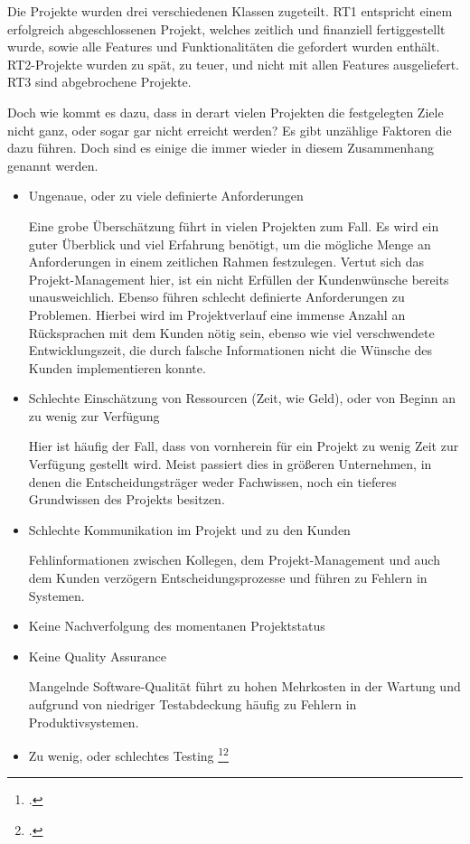 \documentclass[12pt,a4paper,bibliography=totocnumbered,listof=totocnumbered]{scrartcl}
\begin{document}
Die Projekte wurden drei verschiedenen Klassen zugeteilt. RT1 entspricht einem erfolgreich abgeschlossenen Projekt, welches zeitlich und finanziell fertiggestellt wurde, sowie alle Features und Funktionalitäten die gefordert wurden enthält. RT2-Projekte wurden zu spät, zu teuer, und nicht mit allen Features ausgeliefert. RT3 sind abgebrochene Projekte.

Doch wie kommt es dazu, dass in derart vielen Projekten die festgelegten Ziele nicht ganz, oder sogar gar nicht erreicht werden? Es gibt unzählige Faktoren die dazu führen. Doch sind es einige die immer wieder in diesem Zusammenhang genannt werden. 

\begin{itemize}
	\item Ungenaue, oder zu viele definierte Anforderungen
	
	Eine grobe Überschätzung führt in vielen Projekten zum Fall. Es wird ein guter Überblick und viel Erfahrung benötigt, um die mögliche Menge an Anforderungen in einem zeitlichen Rahmen festzulegen. Vertut sich das Projekt-Management hier, ist ein nicht Erfüllen der Kundenwünsche bereits unausweichlich.
	Ebenso führen schlecht definierte Anforderungen zu Problemen. Hierbei wird im Projektverlauf eine immense Anzahl an Rücksprachen mit dem Kunden nötig sein, ebenso wie viel verschwendete Entwicklungszeit, die durch falsche Informationen nicht die Wünsche des Kunden implementieren konnte.
	
	\item Schlechte Einschätzung von Ressourcen (Zeit, wie Geld), oder von Beginn an zu wenig zur Verfügung
	
	Hier ist häufig der Fall, dass von vornherein für ein Projekt zu wenig Zeit zur Verfügung gestellt wird. Meist passiert dies in größeren Unternehmen, in denen die Entscheidungsträger weder Fachwissen, noch ein tieferes Grundwissen des Projekts besitzen.
	
	\item Schlechte Kommunikation im Projekt und zu den Kunden
	
	Fehlinformationen zwischen Kollegen, dem Projekt-Management und auch dem Kunden verzögern Entscheidungsprozesse und führen zu Fehlern in Systemen.
	
	\item Keine Nachverfolgung des momentanen Projektstatus
	\item Keine Quality Assurance
	
	Mangelnde Software-Qualität führt zu hohen Mehrkosten in der Wartung und aufgrund von niedriger Testabdeckung häufig zu Fehlern in Produktivsystemen.
	
	\item Zu wenig, oder schlechtes Testing
	\footcite[page-range]{charette}\footcite[page-range]{haughey}
\end{itemize}
\end{document}
